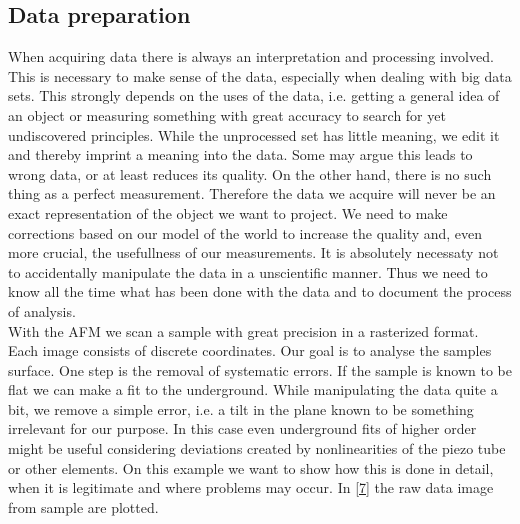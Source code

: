 \documentclass[paper=a4,fontsize=10pt,DIV=18,twocolumn,parskip=half]{scrartcl}
\numberwithin{equation}{section}    %
\begin{document}
\subsection{Data preparation}
When acquiring data there is always an interpretation and processing involved.  
This is necessary to make sense of the data, especially when dealing with big 
data sets. This strongly depends on the uses of the data, i.e. getting a general 
idea of an object or measuring something with great accuracy to search for yet 
undiscovered principles. While the unprocessed set has little meaning, we edit 
it and thereby imprint a meaning into the data. Some may argue this leads to 
wrong data, or at least reduces its quality. On the other hand, there is no such 
thing as a perfect measurement.  Therefore the data we acquire will never be an 
exact representation of the object we want to project. We need to make 
corrections based on our model of the world to increase the quality and, even 
more crucial, the usefullness of our measurements.  It is absolutely necessaty 
not to accidentally manipulate the data in a unscientific manner. Thus we need 
to know all the time what has been done with the data and to document the 
process of analysis. \\
With the AFM we scan a sample with great precision in a rasterized format. Each 
image consists of discrete coordinates. Our goal is to analyse the samples 
surface. One step is the removal of systematic errors. If the sample is known to 
be flat we can make a fit to the underground. While manipulating the data quite 
a bit, we remove a simple error, i.e. a tilt in the plane known to be something 
irrelevant for our purpose. In this case even underground fits of higher order 
might be useful considering deviations created by nonlinearities of the piezo 
tube or other elements. On this example we want to show how this is done in 
detail, when it is legitimate and where problems may occur. In \ref{7} the 
raw data image from sample  are plotted.
\end{document}

